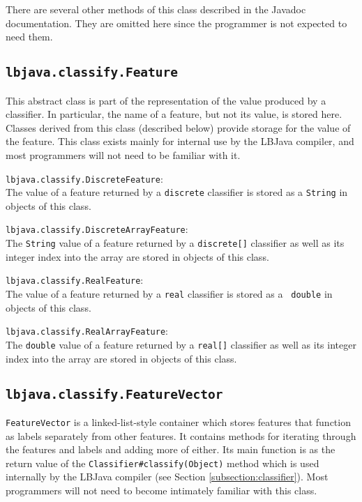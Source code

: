 There are several other methods of this class described in the Javadoc
documentation.  They are omitted here since the programmer is not expected to
need them.

\subsection{{\tt lbjava.classify.Feature}} \label{subsection:feature}
This abstract class is part of the representation of the value produced by a
classifier.  In particular, the name of a feature, but not its value, is
stored here.  Classes derived from this class (described below) provide
storage for the value of the feature.  This class exists mainly for internal
use by the LBJava compiler, and most programmers will not need to be familiar
with it.

\begin{list}{}{}
\item[{\tt lbjava.classify.DiscreteFeature}:] ~\\
The value of a feature returned by a {\tt discrete} classifier is stored as a
{\tt String} in objects of this class.

\item[{\tt lbjava.classify.DiscreteArrayFeature}:] ~\\
The {\tt String} value of a feature returned by a {\tt discrete[]} classifier
as well as its integer index into the array are stored in objects of this
class.

\item[{\tt lbjava.classify.RealFeature}:] ~\\
The value of a feature returned by a {\tt real} classifier is stored as a {\tt
double} in objects of this class.

\item[{\tt lbjava.classify.RealArrayFeature}:] ~\\
The {\tt double} value of a feature returned by a {\tt real[]} classifier as
well as its integer index into the array are stored in objects of this class.
\end{list}

\subsection{{\tt lbjava.classify.FeatureVector}}\label{subsection:featureVector}
{\tt FeatureVector} is a linked-list-style container which stores features
that function as labels separately from other features.  It contains methods
for iterating through the features and labels and adding more of either.  Its
main function is as the return value of the {\tt Classifier\#classify(Object)}
method which is used internally by the LBJava compiler (see Section
\ref{subsection:classifier}).  Most programmers will not need to become
intimately familiar with this class.

